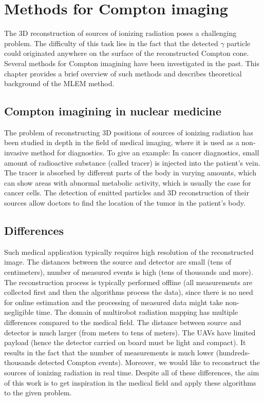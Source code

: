\chapter{Methods for Compton imaging\label{chap:mlem_theory}}
The 3D reconstruction of sources of ionizing radiation poses a challenging problem.
The difficulty of this task lies in the fact that the detected $\gamma$ particle could originated anywhere on the surface of the reconstructed Compton cone.
Several methods for Compton imagining have been investigated in the past.
This chapter provides a brief overview of such methods and describes theoretical background of the \ac{MLEM} method.

\section{Compton imagining in nuclear medicine}
The problem of reconstructing 3D positions of sources of ionizing radiation has been studied in depth in the field of medical imaging, where it is used as a non-invasive method for diagnostics.
To give an example:
In cancer diagnostics, small amount of radioactive substance (called tracer) is injected into the patient's vein.
The tracer is absorbed by different parts of the body in varying amounts, which can show areas with abnormal metabolic activity, which is usually the case for cancer cells.
The detection of emitted particles and 3D reconstruction of their sources allow doctors to find the location of the tumor in the patient's body.

\section{Differences}
Such medical application typically requires high resolution of the reconstructed image.
The distances between the source and detector are small (tens of centimeters), number of measured events is high (tens of thousands and more).
The reconstruction process is typically performed offline (all measurements are collected first and then the algorithms process the data), since there is no need for online estimation and the processing of measured data might take non-negligible time.
The domain of multirobot radiation mapping has multiple differences compared to the medical field.
The distance between source and detector is much larger (from meters to tens of meters).
The \ac{UAV}s have limited payload (hence the detector carried on board must be light and compact).
It results in the fact that the number of measurements is much lower (hundreds-thousands detected Compton events).
Moreover, we would like to reconstruct the sources of ionizing radiation in real time.
Despite all of these differences, the aim of this work is to get inspiration in the medical field and apply these algorithms to the given problem.

